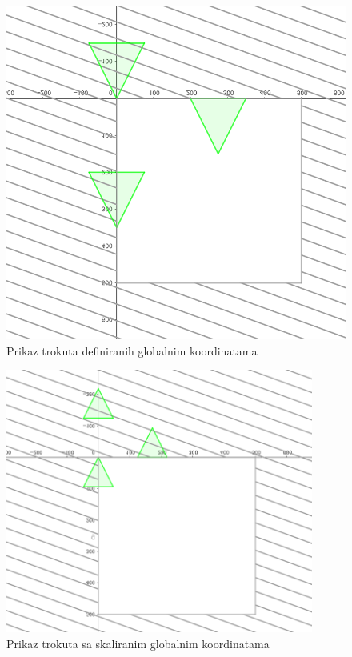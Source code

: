 \documentclass{foi}
\begin{document}
\begin{figure}[H]
    \centering
    \includegraphics[width=1\textwidth]{slike/5_GlobalniTrokutiUnutarZaslona.png}
    \captionsetup{justification=centering}
    \caption{Prikaz trokuta definiranih globalnim koordinatama}
\label{fig:GlobalniTrokutiUnutarZaslona}
\end{figure}
\begin{figure}[H]
    \centering
    \includegraphics[width=0.9\textwidth]{slike/6_SkaliraniGlobalniTrokutiUnutarZaslona.png}
    \captionsetup{justification=centering}
    \caption{Prikaz trokuta sa skaliranim globalnim koordinatama}
\label{fig:SkaliraniGlobalniTrokutiUnutarZaslona}
\end{figure}
\end{document}
